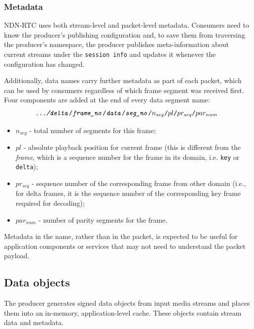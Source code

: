 \documentclass{icn/sig-alternate-2013} %
\newcommand{\ndnrtcName}{NDN-RTC} %
\begin{document}
\subsubsection{Metadata} 

\ndnrtcName{} uses both stream-level and packet-level metadata. 
Consumers need to know the producer's publishing configuration and, to save them from traversing the producer's namespace, the producer publishes meta-information about current streams under the \texttt{session info} and updates it whenever the configuration has changed.

Additionally, data names carry further metadata as part of each packet, which can be used by consumers regardless of which frame segment was received first. 
Four components are added at the end of every data segment name:
\small\begin{equation}
\texttt{\textit{.../delta}/\textit{frame\_no}/\textit{data}/\textit{seg\_no}/\textbf{$n_{seg}$}/\textbf{$pl$}/\textbf{$pr_{seq}$}/\textbf{$par_{num}$} \nonumber}
\end{equation}\normalsize
\begin{itemize}[label={}]
\item \texttt{$n_{seg}$} - total number of segments for this frame;
\item \texttt{$pl$} - absolute playback position for current frame (this is different from the \textit{frame}, which is a sequence number for the frame in its domain, i.e. \texttt{key} or \texttt{delta});
\item \texttt{$pr_{seq}$} - sequence number of the corresponding frame from other domain (i.e., for delta frames, it is the sequence number of the corresponding key frame required for decoding);
\item \texttt{$par_{num}$} - number of parity segments for the frame.
\end{itemize}
Metadata in the name, rather than in the packet, is expected to be useful for application components or services that may not need to understand the packet payload. 

\subsection{Data objects}
The producer generates signed data objects from input media streams and places them into an in-memory, application-level cache.  These objects contain stream data and metadata.
\end{document}

